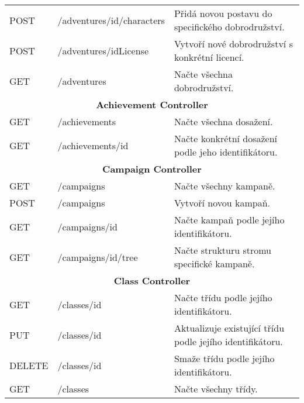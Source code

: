 \begin{longtable}{|l|l|p{}|}
    POST            & /adventures/{id}/characters & Přidá novou postavu do specifického dobrodružství.                  \\
    POST            & /adventures/{idLicense}     & Vytvoří nové dobrodružství s konkrétní licencí.                     \\
    GET             & /adventures                 & Načte všechna dobrodružství.                                        \\
    \hline
    \multicolumn{3}{|c|}{\textbf{Achievement Controller}}                                                               \\
    \hline
    GET             & /achievements               & Načte všechna dosažení.                                             \\
    GET             & /achievements/{id}          & Načte konkrétní dosažení podle jeho identifikátoru.                 \\
    \hline
    \multicolumn{3}{|c|}{\textbf{Campaign Controller}}                                                                  \\
    \hline
    GET             & /campaigns                  & Načte všechny kampaně.                                              \\
    POST            & /campaigns                  & Vytvoří novou kampaň.                                               \\
    GET             & /campaigns/{id}             & Načte kampaň podle jejího identifikátoru.                           \\
    GET             & /campaigns/{id}/tree        & Načte strukturu stromu specifické kampaně.                          \\
    \hline
    \multicolumn{3}{|c|}{\textbf{Class Controller}}                                                                     \\
    \hline
    GET             & /classes/{id}               & Načte třídu podle jejího identifikátoru.                            \\
    PUT             & /classes/{id}               & Aktualizuje existující třídu podle jejího identifikátoru.           \\
    DELETE          & /classes/{id}               & Smaže třídu podle jejího identifikátoru.                            \\
    GET             & /classes                    & Načte všechny třídy.                                                \\

\end{longtable}
